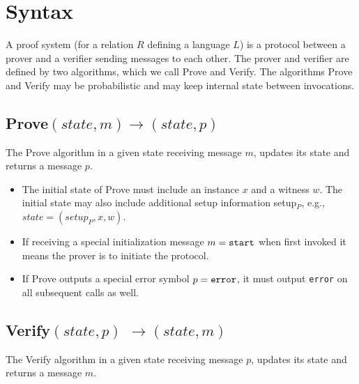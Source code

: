 \section{Syntax}
\label{security:syntax}
 
A proof system (for a relation $R$ defining a language $L$) is a protocol between a prover and a verifier sending messages to each other. 
The prover and verifier are defined by two algorithms, which we call Prove and Verify. 
The algorithms Prove and Verify may be probabilistic and may keep internal state between invocations.



\subsection[Prove]{\textbf{Prove}$(state, m) \rightarrow (state, p)$}

The Prove algorithm in a given state receiving message $m$, updates its state and returns a message $p$.\loosen

\begin{itemize}
\item The initial state of Prove must include an instance $x$ and a witness $w$. 
	The initial state may also include additional setup information setup$_P$, e.g., $state = (setup_P, x, w)$.
\item If receiving a special initialization message $m = \tt start$ when first invoked it means the prover is to initiate the protocol.
\item If Prove outputs a special error symbol $p = \tt error$, it must output {\tt error} on all subsequent calls as well.
\end{itemize}


\subsection[Verify]{\textbf{Verify}$(state, p)$ $\rightarrow (state, m)$}

The Verify algorithm in a given state receiving message $p$, updates its state and returns a message $m$.\loosen

